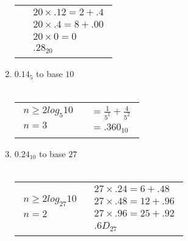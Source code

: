 \documentclass[12pt]{article}
\begin{document}
\begin{enumerate}
\begin{tabular}{l | l}
        &

        $\begin{aligned}
            20 \times .12 = 2 + .4 \\
            20 \times .4 = 8 + .00 \\
            20 \times 0 = 0 \\
            \boxed{.28_{20}}
        \end{aligned}$

     \end{tabular}
     
     \pagebreak

     \item $0.14_{5}$ to base $10$ \\  \\
     \begin{tabular}{l | l}

        $\begin{aligned}
            n \geq 2log_{5}10 \\
            n = 3 \\
        \end{aligned}$

        &

        $\begin{aligned}
            = \frac{1}{5^1} + \frac{4}{5^2} \\
            = \boxed{.360_{10}}
        \end{aligned}$

     \end{tabular}
     

     \item $0.24_{10}$ to base $27$ \\ \\
     \begin{tabular}{l | l}

        $\begin{aligned}
            n \geq 2log_{27}10 \\
            n = 2 \\
        \end{aligned}$

        &

        $\begin{aligned}
            27 \times .24 = 6 + .48 \\
            27 \times .48 = 12 + .96 \\
            27 \times .96 = 25 + .92 \\
            \boxed{.6D_{27}}
        \end{aligned}$


\end{tabular}
\end{enumerate}
\end{document}

